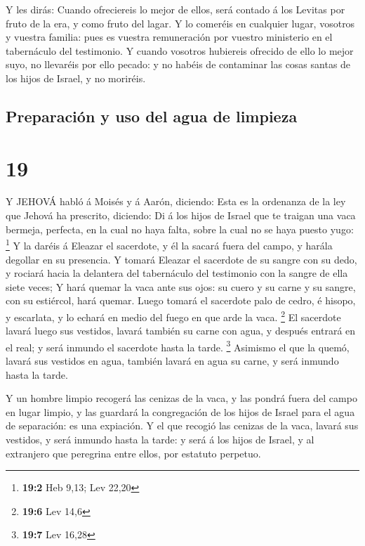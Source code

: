  Y les dirás: Cuando ofreciereis lo mejor de ellos, será
contado á los Levitas por fruto de la era, y como fruto del lagar.
 Y lo comeréis en cualquier lugar, vosotros y vuestra
familia: pues es vuestra remuneración por vuestro ministerio en el
tabernáculo del testimonio.  Y cuando vosotros hubiereis
ofrecido de ello lo mejor suyo, no llevaréis por ello pecado: y no
habéis de contaminar las cosas santas de los hijos de Israel, y no
moriréis.

\hypertarget{preparaciuxf3n-y-uso-del-agua-de-limpieza}{%
\subsection{Preparación y uso del agua de
limpieza}\label{preparaciuxf3n-y-uso-del-agua-de-limpieza}}

\hypertarget{section-18}{%
\section{19}\label{section-18}}

 Y JEHOVÁ habló á Moisés y á Aarón, diciendo: 
Esta es la ordenanza de la ley que Jehová ha prescrito, diciendo: Di á
los hijos de Israel que te traigan una vaca bermeja, perfecta, en la
cual no haya falta, sobre la cual no se haya puesto yugo: \footnote{\textbf{19:2}
  Heb 9,13; Lev 22,20}  Y la daréis á Eleazar el sacerdote,
y él la sacará fuera del campo, y harála degollar en su presencia.
 Y tomará Eleazar el sacerdote de su sangre con su dedo, y
rociará hacia la delantera del tabernáculo del testimonio con la sangre
de ella siete veces;  Y hará quemar la vaca ante sus ojos:
su cuero y su carne y su sangre, con su estiércol, hará quemar.
 Luego tomará el sacerdote palo de cedro, é hisopo, y
escarlata, y lo echará en medio del fuego en que arde la vaca.
\footnote{\textbf{19:6} Lev 14,6}  El sacerdote lavará luego
sus vestidos, lavará también su carne con agua, y después entrará en el
real; y será inmundo el sacerdote hasta la tarde. \footnote{\textbf{19:7}
  Lev 16,28}  Asimismo el que la quemó, lavará sus vestidos
en agua, también lavará en agua su carne, y será inmundo hasta la tarde.

 Y un hombre limpio recogerá las cenizas de la vaca, y las
pondrá fuera del campo en lugar limpio, y las guardará la congregación
de los hijos de Israel para el agua de separación: es una expiación.
 Y el que recogió las cenizas de la vaca, lavará sus
vestidos, y será inmundo hasta la tarde: y será á los hijos de Israel, y
al extranjero que peregrina entre ellos, por estatuto perpetuo.


